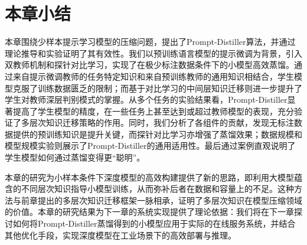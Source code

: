 \documentclass[../main.tex]{subfiles}
\begin{document}
\section{本章小结}
\label{sec:3-6}
本章围绕少样本提示学习模型的压缩问题，提出了Prompt-Distiller算法，并通过理论推导和实验证明了其有效性。我们以预训练语言模型的提示微调为背景，引入双教师机制和探针对比学习，实现了在极少标注数据条件下的小模型高效蒸馏。通过来自提示微调教师的任务特定知识和来自预训练教师的通用知识相结合，学生模型克服了训练数据匮乏的限制；而基于对比学习的中间层知识迁移则进一步提升了学生对教师深层判别模式的掌握。从多个任务的实验结果看，Prompt-Distiller显著提高了学生模型的精度，在一些任务上甚至达到或超过教师模型的表现，充分验证了多层次知识迁移策略的作用。同时，我们分析了各组件的贡献，发现无标注数据提供的预训练知识是提升关键，而探针对比学习亦增强了蒸馏效果；数据规模和模型规模实验则展示了Prompt-Distiller的通用适用性。最后通过案例直观说明了学生模型如何通过蒸馏变得更“聪明”。

本章的研究为小样本条件下深度模型的高效构建提供了新的思路，即利用大模型蕴含的不同层次知识指导小模型训练，从而弥补后者在数据和容量上的不足。这种方法与前章提出的多层次知识迁移框架一脉相承，证明了多层次知识在模型压缩领域的价值。本章的研究结果为下一章的系统实现提供了理论依据：我们将在下一章探讨如何将Prompt-Distiller蒸馏得到的小模型应用于实际的在线服务系统，并结合其他优化手段，实现深度模型在工业场景下的高效部署与推理。
\end{document}
